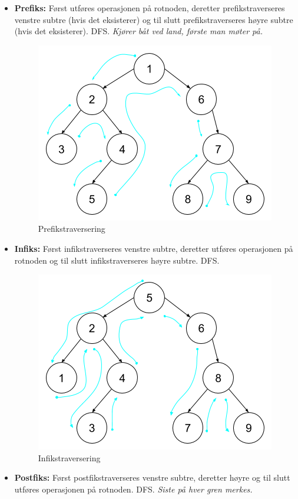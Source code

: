 \begin{itemize}
    \item \textbf{Prefiks:} Først utføres operasjonen på rotnoden, deretter prefikstraverseres venstre subtre (hvis det eksisterer) og til slutt prefikstraverseres høyre subtre (hvis det eksisterer). DFS. \textit{Kjører båt ved land, første man møter på.}
    \begin{figure}[H]
    \includegraphics[scale=0.45]{images/prefiks}
    \centering %
    \caption{Prefikstraversering}
    \label{fig:prefiks}
    \end{figure}
    \item \textbf{Infiks:} Først infikstraverseres venstre subtre, deretter utføres operasjonen på rotnoden og til slutt infikstraverseres høyre subtre. DFS. 
    \begin{figure}[H]
    \includegraphics[scale=0.45]{images/infiks}
    \centering %
    \caption{Infikstraversering}
    \label{fig:infiks}
    \end{figure}
    \item \textbf{Postfiks:} Først postfikstraverseres venstre subtre, deretter høyre og til slutt utføres operasjonen på rotnoden. DFS. \textit{Siste på hver gren merkes.}

\end{itemize}
